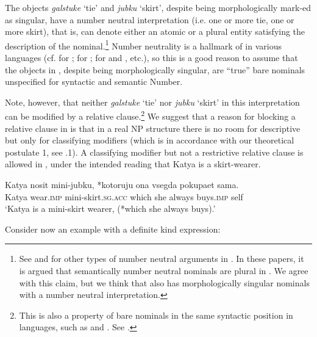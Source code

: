 \documentclass[output=paper
,modfonts
,nonflat]{langsci/langscibook}
\begin{document}
	The objects \textit{galstuke} `tie' and \textit{jubku} `skirt', despite being morphologically mark\hyp{}ed as singular, have a number neutral interpretation (i.e. one or more tie, one or more skirt), that is, can denote either an atomic or a plural entity satisfying the description of the nominal.\footnote{See \citet{Kagan2011} and \citet{Pereltsvaig2013} for other types of number neutral arguments in . In these papers, it is argued that semantically number neutral nominals are plural in . We agree with this claim, but we think that  also has morphologically singular nominals with a number neutral interpretation.} Number neutrality is a hallmark of  in various languages (cf. \citealt{Farkas2003} for ; \citealt{Dayal2004} for ; \citealt{Espinal2011} for  and , etc.), so this is a good reason to assume that the objects in , despite being morphologically singular, are ``true'' bare nominals unspecified for syntactic and semantic Number. 
	
	Note, however, that neither \textit{galstuke} `tie' nor \textit{jubku} `skirt' in this interpretation can be modified by a relative clause.\footnote{This is also a property of bare nominals in the same syntactic position in  languages, such as  and . See \citet{Espinal2011}.} We suggest that a reason for blocking a relative clause in  is that in a real NP structure there is no room for descriptive but only for classifying modifiers (which is in accordance with our theoretical postulate 1, see .1). A classifying modifier but not a restrictive relative clause is allowed in , under the intended reading that Katya is a skirt-wearer. 
	
	\ea\label{ex:borik:23}
	\gll Katya 	nosit mini-jubku, {\op}\textnormal{*}kotoruju	ona	vsegda		pokupaet sama{\cp}. \\
	Katya wear.\textsc{imp}	mini-skirt.\textsc{sg.acc} {\db}{\phantom{*}}which she always buys.\textsc{imp} self\\
	
	\glt `Katya is a mini-skirt wearer, (*which she always buys).'
	\z
	
	Consider now an example with a definite kind expression: 
	
\end{document}
